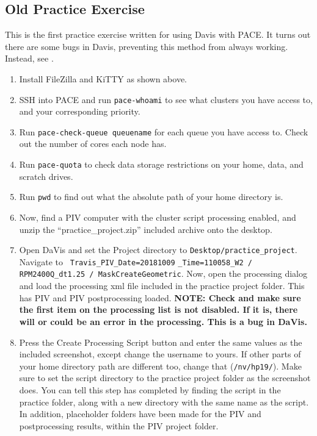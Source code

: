 \documentclass{article}
\newcommand{\quotes}[1]{``#1''}
\begin{document}
	\subsection{Old Practice Exercise}
	This is the first practice exercise written for using Davis with PACE.  It turns out there are some bugs in Davis, preventing this method from always working.  Instead, see .
	
	\begin{enumerate}
		\item Install FileZilla and KiTTY as shown above.
		\item SSH into PACE and run \texttt{pace-whoami} to see what clusters you have access to, and your corresponding priority.
		\item Run \texttt{pace-check-queue queuename} for each queue you have access to. Check out the number of cores each node has.
		\item Run \texttt{pace-quota} to check data storage restrictions on your home, data, and scratch drives.
		\item Run \texttt{pwd} to find out what the absolute path of your home directory is.
		\item Now, find a PIV computer with the cluster script processing enabled, and unzip the \quotes{practice\_project.zip} included archive onto the desktop.
		\item Open DaVis and set the Project directory to \texttt{Desktop/practice\_project}.  Navigate to \texttt{ Travis\_PIV\_Date=20181009} \texttt{\_Time=110058\_W2 / RPM2400Q\_dt1.25 / MaskCreateGeometric}.  Now, open the processing dialog and load the processing xml file included in the practice project folder.  This has PIV and PIV postprocessing loaded.  \textbf{NOTE: Check and make sure the first item on the processing list is not disabled.  If it is, there will or could be an error in the processing.  This is a bug in DaVis.}
		\item Press the Create Processing Script button and enter the same values as the included screenshot, except change the username to yours.  If other parts of your home directory path are different too, change that (\texttt{/nv/hp19/}).  Make sure to set the script directory to the practice project folder as the screenshot does.  You can tell this step has completed by finding the script in the practice folder, along with a new directory with the same name as the script.  In addition, placeholder folders have been made for the PIV and postprocessing results, within the PIV project folder.

\end{enumerate}
\end{document}
